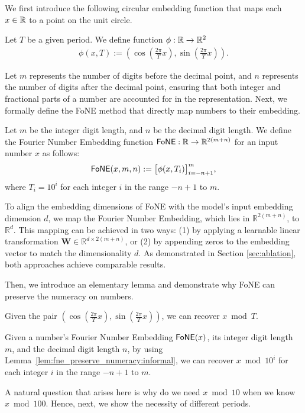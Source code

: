 We first  introduce the following circular embedding function that maps each $x \in \mathbb{R}$ to a point on the unit circle.
\begin{definition}\label{def:circular}
Let $T$ be a given period. We define function $\phi: \mathbb{R} \rightarrow \mathbb{R}^2$
\begin{align*}
\phi(x, T) :=  \left(\cos \left(\tfrac{2\pi}{T}x \right),\sin \left(\tfrac{2\pi}{T}x \right) \right).
\end{align*}
\end{definition}
 Let $m$ represents the number of digits before the decimal point, and $n$ represents the number of digits after the decimal point, ensuring that both integer and fractional parts of a number are accounted for in the representation. Next, we formally define the FoNE method that directly map numbers to their embedding.
\begin{definition}
Let $m$ be the integer digit length, and $n$ be the decimal digit length. We define the Fourier Number Embedding function $\operatorname{\mathsf{FoNE}}: \mathbb{R} \rightarrow \mathbb{R}^{2(m+n)}$ for an input number $x$ as follows:
\begin{align*}
    \operatorname{\mathsf{FoNE}}(x,m,n) := \bigl[\phi(x,T_i)\bigr]_{i=-n+1}^{m},
\end{align*}
where $T_i = 10^{i}$ for each integer $i$ in the range $-n+1$ to $m$.
\end{definition}
To align the embedding dimensions of FoNE with the model's input embedding dimension \( d \), we map the Fourier Number Embedding, which lies in \( \mathbb{R}^{2(m+n)} \), to \( \mathbb{R}^d \). This mapping can be achieved in two ways: (1) by applying a learnable linear transformation \( \mathbf{W} \in \mathbb{R}^{d \times 2(m+n)} \), or (2) by appending zeros to the embedding vector to match the dimensionality \( d \). As demonstrated in Section \ref{sec:ablation}, both approaches achieve comparable results.


Then, we introduce an elementary lemma and demonstrate why FoNE can preserve the numeracy on numbers.
\begin{lemma}\label{lem:fne_preserve_numeracy:informal}
    Given the pair $\left(\cos\left(\tfrac{2\pi}{T}x\right), \sin\left(\tfrac{2\pi}{T}x\right)\right)$, we can recover 
$x \bmod T$.
\end{lemma}
\begin{lemma}
    Given a number's Fourier Number Embedding $\operatorname{\mathsf{FoNE}}(x)$, its integer digit length $m$, and the decimal digit length $n$, by using Lemma~\ref{lem:fne_preserve_numeracy:informal}, we can recover $x \bmod 10^{i}$ for each integer $i$ in the range $-n+1$ to $m$.

\end{lemma}
A natural question that arises here is why do we need $x \bmod 10$ when we know $x \bmod 100$. Hence, next, we show the necessity of different periods.

